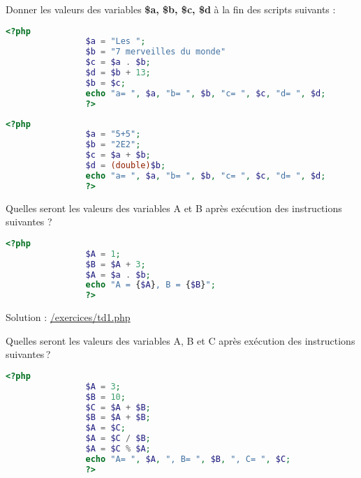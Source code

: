 \documentclass[10pt,a4paper,notitlepage]{article}
\begin{document}
	\begin{definition}
		\hspace{2ex} Donner les valeurs des variables \textbf{{\color{dkgreen} \$a, \$b, \$c, \$d}} à la fin des scripts suivants :
		\begin{center}
			\begin{lstlisting}[language=PHP]
				<?php
				$a = "Les ";
				$b = "7 merveilles du monde"
				$c = $a . $b;
				$d = $b + 13;
				$b = $c;
				echo "a= ", $a, "b= ", $b, "c= ", $c, "d= ", $d;
				?> 
			\end{lstlisting}
		\end{center}
		
		\begin{center}
			\begin{lstlisting}[language=PHP]
				<?php
				$a = "5+5";
				$b = "2E2";
				$c = $a + $b;
				$d = (double)$b;
				echo "a= ", $a, "b= ", $b, "c= ", $c, "d= ", $d;
				?>
			\end{lstlisting}
		\end{center}
	\end{definition}
	\begin{definition}
		\hspace{2ex} Quelles seront les valeurs des variables A et B après exécution des instructions suivantes ?
		\begin{center}
			\begin{lstlisting}[language=PHP]
				<?php
				$A = 1;
				$B = $A + 3;
				$A = $a . $b;
				echo "A = {$A}, B = {$B}";
				?> 
			\end{lstlisting}
		\end{center}
		Solution : \href{https://exercicesdephp.000webhostapp.com/exercices/td1.php}{\color{blue} /exercices/td1.php}
	\end{definition}
	\begin{definition}
		\hspace{2ex} Quelles seront les valeurs des variables A, B et C après exécution des instructions suivantes ?
		\begin{center}
			\begin{lstlisting}[language=PHP]
				<?php
				$A = 3;
				$B = 10;
				$C = $A + $B;
				$B = $A + $B;
				$A = $C;
				$A = $C / $B;
				$A = $C % $A;
				echo "A= ", $A, ", B= ", $B, ", C= ", $C;
				?> 
			\end{lstlisting}
		\end{center}
	
	\end{definition}
	
\end{document}
